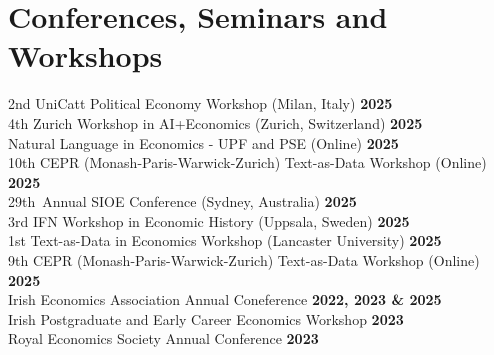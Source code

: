 \documentclass{resume}
\begin{document}
\section{Conferences, Seminars and Workshops} 
\begin{content}
    {2nd UniCatt Political Economy Workshop (Milan, Italy)} \hfill {\bf 2025} \\
    {4th Zurich Workshop in AI+Economics (Zurich, Switzerland)} \hfill {\bf 2025} \\
    {Natural Language in Economics - UPF and PSE (Online)} \hfill {\bf 2025} \\
    {10th CEPR (Monash-Paris-Warwick-Zurich) Text-as-Data Workshop (Online)} \hfill {\bf 2025} \\
    {29th Annual SIOE Conference (Sydney, Australia)} \hfill {\bf 2025} \\
    {3rd IFN Workshop in Economic History (Uppsala, Sweden)} \hfill {\bf 2025} \\
    {1st Text-as-Data in Economics Workshop (Lancaster University)} \hfill {\bf 2025} \\
    {9th CEPR (Monash-Paris-Warwick-Zurich) Text-as-Data Workshop (Online)} \hfill {\bf 2025} \\
    {Irish Economics Association Annual Coneference} \hfill {\bf 2022, 2023 \& 2025} \\
    {Irish Postgraduate and Early Career Economics Workshop} \hfill {\bf 2023}\\
    {Royal Economics Society Annual Conference} \hfill {\bf 2023} \\
\sectionlineskip
\end{content}
\vspace{-3\medskipamount}
\end{document}
